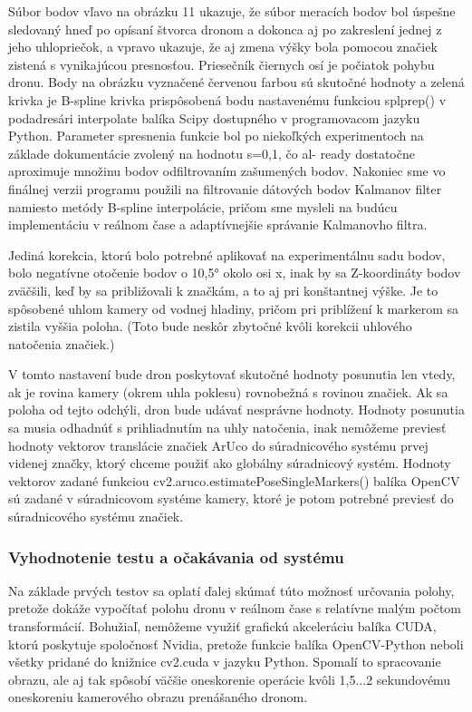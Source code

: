 {Súbor bodov vľavo na obrázku 11 ukazuje, že súbor meracích bodov bol úspešne sledovaný hneď po opísaní štvorca dronom a dokonca aj po zakreslení jednej z jeho uhlopriečok, a vpravo ukazuje, že aj zmena výšky bola pomocou značiek zistená s vynikajúcou presnosťou. Priesečník čiernych osí je počiatok pohybu dronu. Body na obrázku vyznačené červenou farbou sú skutočné hodnoty a zelená krivka je B-spline krivka prispôsobená bodu nastavenému funkciou splprep() v podadresári interpolate balíka Scipy dostupného v programovacom jazyku Python. Parameter spresnenia funkcie bol po niekoľkých experimentoch na základe dokumentácie \citep{scipy-docs} zvolený na hodnotu s=0,1, čo al- ready dostatočne aproximuje množinu bodov odfiltrovaním zašumených bodov. Nakoniec sme vo finálnej verzii programu použili na filtrovanie dátových bodov Kalmanov filter namiesto metódy B-spline interpolácie, pričom sme mysleli na budúcu implementáciu v reálnom čase a adaptívnejšie správanie Kalmanovho filtra. 

Jediná korekcia, ktorú bolo potrebné aplikovať na experimentálnu sadu bodov, bolo negatívne otočenie bodov o 10,5° okolo osi x, inak by sa Z-koordináty bodov zväčšili, keď by sa približovali k značkám, a to aj pri konštantnej výške. Je to spôsobené uhlom kamery od vodnej hladiny, pričom pri priblížení k markerom sa zistila vyššia poloha. (Toto bude neskôr zbytočné kvôli korekcii uhlového natočenia značiek.)

V tomto nastavení bude dron poskytovať skutočné hodnoty posunutia len vtedy, ak je rovina kamery (okrem uhla poklesu) rovnobežná s rovinou značiek. Ak sa poloha od tejto odchýli, dron bude udávať nesprávne hodnoty. Hodnoty posunutia sa musia odhadnúť s prihliadnutím na uhly natočenia, inak nemôžeme previesť hodnoty vektorov translácie značiek ArUco do súradnicového systému prvej videnej značky, ktorý chceme použiť ako globálny súradnicový systém.  Hodnoty vektorov zadané funkciou cv2.aruco.estimatePoseSingleMarkers() balíka OpenCV sú zadané v súradnicovom systéme kamery, ktoré je potom potrebné previesť do súradnicového systému značiek. 

\subsubsection{Vyhodnotenie testu a očakávania od systému}
Na základe prvých testov sa oplatí ďalej skúmať túto možnosť určovania polohy, pretože dokáže vypočítať polohu dronu v reálnom čase s relatívne malým počtom transformácií. Bohužiaľ, nemôžeme využiť grafickú akceleráciu balíka CUDA, ktorú poskytuje spoločnosť Nvidia, pretože funkcie balíka OpenCV-Python neboli všetky pridané do knižnice cv2.cuda v jazyku Python. Spomalí to spracovanie obrazu, ale aj tak spôsobí väčšie oneskorenie operácie kvôli 1,5...2 sekundovému oneskoreniu kamerového obrazu prenášaného dronom. 

}
